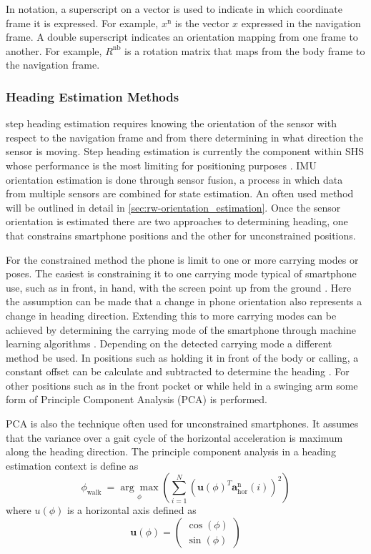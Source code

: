 In notation, a superscript on a vector is used to indicate in which coordinate frame it is expressed. For example, $x^\mathrm{n}$ is the vector $x$ expressed in the navigation frame. A double superscript indicates an orientation mapping from one frame to another. For example, $R^\mathrm{nb}$ is a rotation matrix that maps from the body frame to the navigation frame.

\subsubsection{Heading Estimation Methods}
step heading estimation requires knowing the orientation of the sensor with respect to the navigation frame and from there determining in what direction the sensor is moving. Step heading estimation is currently the component within \ac{SHS} whose performance is the most limiting for positioning purposes \cite{Diez2018b, Qian2013,Combettes2017}. IMU orientation estimation is done through sensor fusion, a process in which data from multiple sensors are combined for state estimation. An often used method will be outlined in detail in \cref{sec:rw-orientation_estimation}.
Once the sensor orientation is estimated there are two approaches to determining heading, one that constrains smartphone positions and the other for unconstrained positions. 

For the constrained method the phone is limit to one or more carrying modes or poses. The easiest is constraining it to one carrying mode typical of smartphone use, such as in front, in hand, with the screen point up from the ground \cite{Deng2016}. Here the assumption can be made that a change in phone orientation also represents a change in heading direction. Extending this to more carrying modes can be achieved by determining the carrying mode of the smartphone through machine learning algorithms \cite{Lee2019, Sun2015a}. Depending on the detected carrying mode a different method be used. In positions such as holding it in front of the body or calling, a constant offset can be calculate and subtracted to determine the heading \cite{Sun2015a}. For other positions such as in the front pocket or while held in a swinging arm some form of Principle Component Analysis (PCA) \cite{Deng2016,Lee2019,Sun2015} is performed.\par

PCA is also the technique often used for unconstrained smartphones. It assumes that the variance over a gait cycle of the horizontal acceleration is maximum along the heading direction. The principle component analysis in a heading estimation context is define as
\begin{equation}
	\phi_{\text {walk }}=\underset{\phi}{\arg \max }\left(\sum_{i=1}^{N}\left(\mathbf{u}(\phi)^{T} \mathbf{a}^{\mathrm{n}}_\mathrm{hor}(i)\right)^{2}\right)
\end{equation}
where $ u(\phi) $ is a horizontal axis defined as
\begin{equation}
\mathbf{u}(\phi)=
\left(\begin{array}{l}
	\cos (\phi) \\
	\sin (\phi)  
\end{array}\right)
\end{equation}

